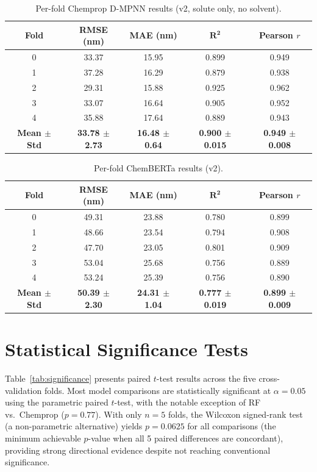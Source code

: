 \documentclass[journal=jcisd8,manuscript=suppinfo]{achemso}
\begin{document}
\begin{table}[htbp]
\centering
\caption{Per-fold Chemprop D-MPNN results (v2, solute only, no solvent).}
\label{tab:perfold_chemprop_nosolvent}
\begin{tabular}{ccccc}
\toprule
\textbf{Fold} & \textbf{RMSE (nm)} & \textbf{MAE (nm)} & $\boldsymbol{R^2}$ & \textbf{Pearson $r$} \\
\midrule
0 & 33.37 & 15.95 & 0.899 & 0.949 \\
1 & 37.28 & 16.29 & 0.879 & 0.938 \\
2 & 29.31 & 15.88 & 0.925 & 0.962 \\
3 & 33.07 & 16.64 & 0.905 & 0.952 \\
4 & 35.88 & 17.64 & 0.889 & 0.943 \\
\midrule
\textbf{Mean $\pm$ Std} & \textbf{33.78 $\pm$ 2.73} & \textbf{16.48 $\pm$ 0.64} & \textbf{0.900 $\pm$ 0.015} & \textbf{0.949 $\pm$ 0.008} \\
\bottomrule
\end{tabular}
\end{table}

\begin{table}[htbp]
\centering
\caption{Per-fold ChemBERTa results (v2).}
\label{tab:perfold_chemberta}
\begin{tabular}{ccccc}
\toprule
\textbf{Fold} & \textbf{RMSE (nm)} & \textbf{MAE (nm)} & $\boldsymbol{R^2}$ & \textbf{Pearson $r$} \\
\midrule
0 & 49.31 & 23.88 & 0.780 & 0.899 \\
1 & 48.66 & 23.54 & 0.794 & 0.908 \\
2 & 47.70 & 23.05 & 0.801 & 0.909 \\
3 & 53.04 & 25.68 & 0.756 & 0.889 \\
4 & 53.24 & 25.39 & 0.756 & 0.890 \\
\midrule
\textbf{Mean $\pm$ Std} & \textbf{50.39 $\pm$ 2.30} & \textbf{24.31 $\pm$ 1.04} & \textbf{0.777 $\pm$ 0.019} & \textbf{0.899 $\pm$ 0.009} \\
\bottomrule
\end{tabular}
\end{table}


\section{Statistical Significance Tests}
\label{sec:significance}

Table~\ref{tab:significance} presents paired $t$-test results across the five cross-validation folds.
Most model comparisons are statistically significant at $\alpha = 0.05$ using the parametric paired $t$-test, with the notable exception of RF vs.\ Chemprop ($p = 0.77$).
With only $n = 5$ folds, the Wilcoxon signed-rank test (a non-parametric alternative) yields $p = 0.0625$ for all comparisons (the minimum achievable $p$-value when all 5 paired differences are concordant), providing strong directional evidence despite not reaching conventional significance.
\end{document}
